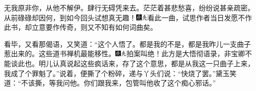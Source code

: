 无我原非你，从他不解伊。肆行无碍凭来去。茫茫着甚悲愁喜，纷纷说甚亲疏密。从前碌碌却因何，{到如今}回头试想真无趣！{\includegraphics[width=3mm]{../Images/00004}\includegraphics[width=3mm]{../Images/00012}\footnotesize \kaishu 看此一曲，试思作者当日发愿不作此书，却立意要作传奇，则又不知有如何词曲矣。}

看毕，又看那偈语，又笑道：“这个人悟了。都是我的不是，都是我昨儿一支曲子惹出来的。这些道书禅机最能移性。{\includegraphics[width=3mm]{../Images/00004}\includegraphics[width=3mm]{../Images/00012}\footnotesize \kaishu 拍案叫绝！此方是大悟彻语录，非宝卿不能谈此也。}明儿认真说起这些疯话来，存了这个意思，都是从我这一只曲子上来，我成了个罪魁了。”说着，便撕了个粉碎，递与丫头们说：“快烧了罢。”黛玉笑道：“不该撕，等我问他。你们跟我来，包管叫他收了这个痴心邪话。”


